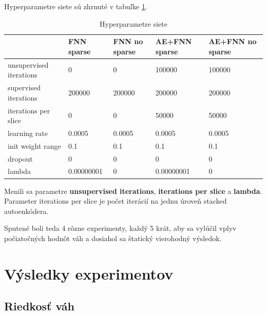 \documentclass[10pt,a4paper]{article}
\begin{document}
Hyperparametre siete sú zhrnuté v tabuľke \ref{tab:Hyperparametre siete}.

\begin{table}[!h]
\centering
\caption{Hyperparametre siete}
\label{tab:Hyperparametre siete}
\begin{tabular}{|l|l|l|l|l|}
\hline
                        & FNN sparse & FNN no sparse & AE+FNN  sparse & AE+FNN no sparse \\ \hline
unsupervised iterations & 0          & 0             & 100000         & 100000           \\ \hline
supervised iterations   & 200000     & 200000        & 200000         & 200000           \\ \hline
iterations per slice    & 0          & 0             & 50000          & 50000            \\ \hline
learning rate           & 0.0005     & 0.0005        & 0.0005         & 0.0005           \\ \hline
init weight range       & 0.1        & 0.1           & 0.1            & 0.1              \\ \hline
dropout                 & 0          & 0             & 0              & 0                \\ \hline
lambda                  & 0.00000001 & 0             & 0.00000001     & 0                \\ \hline
\end{tabular}
\end{table}

Menili sa parametre {\bf unsupervised iterations}, {\bf iterations per slice} a {\bf lambda}.
Parameter iterations per slice je počet iterácií na jednu úroveň stacked autoenkódera.

Sputené boli teda 4 rôzne experimenty, každý 5 krát, aby sa vylúčil vplyv počiatočných hodnôt váh
a dosiahol sa štatický vierohodný výsledok.


\section{Výsledky experimentov}

\subsection{Riedkosť váh}
\end{document}
